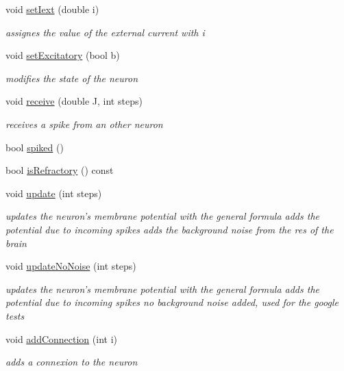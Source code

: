 \begin{DoxyCompactItemize}
void \hyperlink{classNeuron_af4f0d6db611ada478aaff6a6566eda1a}{set\-Iext} (double i)
\begin{DoxyCompactList}\small\item\em assignes the value of the external current with i \end{DoxyCompactList}\item 
void \hyperlink{classNeuron_a96c45daf27a0af6cec1053343ebb33b5}{set\-Excitatory} (bool b)
\begin{DoxyCompactList}\small\item\em modifies the state of the neuron \end{DoxyCompactList}\item 
void \hyperlink{classNeuron_ad4fb36920f288c8eeb2dde850e18d377}{receive} (double J, int steps)
\begin{DoxyCompactList}\small\item\em receives a spike from an other neuron \end{DoxyCompactList}\item 
bool \hyperlink{classNeuron_a95efbf8af058ce38307abc4c229ed046}{spiked} ()
\item 
bool \hyperlink{classNeuron_aa40fbb2b025efb1db420da32e16741c1}{is\-Refractory} () const 
\item 
void \hyperlink{classNeuron_a7b78ae31671fe818d8c8c32710ec87df}{update} (int steps)
\begin{DoxyCompactList}\small\item\em updates the neuron's membrane potential with the general formula adds the potential due to incoming spikes adds the background noise from the res of the brain \end{DoxyCompactList}\item 
void \hyperlink{classNeuron_aece615a05d56f07a16902170ee0bc786}{update\-No\-Noise} (int steps)
\begin{DoxyCompactList}\small\item\em updates the neuron's membrane potential with the general formula adds the potential due to incoming spikes no background noise added, used for the google tests \end{DoxyCompactList}\item 
void \hyperlink{classNeuron_a9893572b8193f55a56a67362ace12d7a}{add\-Connection} (int i)
\begin{DoxyCompactList}\small\item\em adds a connexion to the neuron \end{DoxyCompactList}\end{DoxyCompactItemize}


